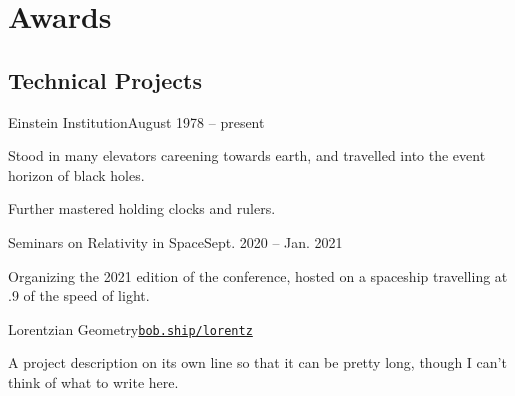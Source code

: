 \documentclass{resume}
\begin{document}
\noindent 
\begin{minipage}[t]{.41\textwidth} \vspace{0pt}
\renewcommand{\refname}{Publications}


\nocite{*}
\sectionlineskip

\section{Awards}
    \medskip
    
    
\sectionlineskip

\end{minipage}
\hfill 
\begin{minipage}[t]{.57\textwidth} 
\vspace{0pt} %
\subsection{Technical Projects} 
\begin{content}
    \begin{project}{Einstein Institution}{August 1978 -- present}
        \item Stood in many elevators careening towards earth, and travelled into the event horizon of black holes. 
        \item Further mastered holding clocks and rulers.
    \end{project}
    
    \begin{project}{Seminars on Relativity in Space}{Sept. 2020 -- Jan. 2021}
    \item Organizing the 2021 edition of the conference, hosted on a spaceship travelling at .9 of the speed of light.
    \end{project}
    
    \begin{project}{Lorentzian Geometry}{\normalfont\href{https://bob.ship/lorentz}{\texttt{bob.ship/lorentz}}}
    \item A project description on its own line so that it can be pretty long, though I can't think of what to write here.  
    \end{project}
    
\end{content}
\end{minipage}
\end{document}
